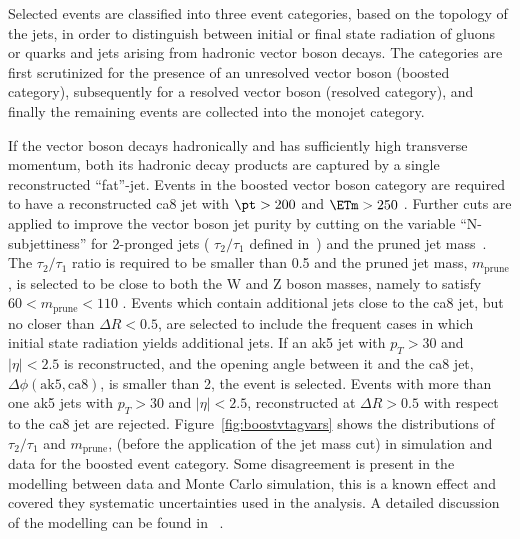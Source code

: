 Selected events are classified into three event categories, based on the topology of the jets, in order to distinguish between 
initial or final state radiation of gluons or quarks and jets arising from hadronic vector boson decays.
The categories are first scrutinized for the presence of an unresolved
vector boson (boosted category), subsequently for a resolved vector
boson (resolved category), and finally the remaining events are collected into the monojet category. 

If the vector boson decays hadronically and has sufficiently high transverse momentum, both its hadronic
decay products are captured by a single reconstructed ``fat''-jet.
Events in the boosted vector boson category are required to
have a reconstructed ca8 jet with $\pt>200$ \gev and  $\ETm>250$ \gev.  Further cuts are applied to improve the vector boson jet
purity by cutting on the variable ``N-subjettiness'' for 2-pronged
jets ( $\tau_2/\tau_1$ defined in~\cite{Thaler:2010tr,Thaler:2011gf})
and the pruned jet mass~\cite{Ellis:2009me}. The $\tau_2/\tau_1$ ratio
is required to be smaller than 0.5 and the pruned jet mass, $m_{\mathrm{prune}}$, is selected to
be close to both the W and Z boson masses, namely to satisfy $60<m_{\mathrm{prune}}<110$ \gev.   
Events which contain additional jets close to the ca8 jet, but no closer than $\Delta R < 0.5$,
are selected to include the frequent cases in which initial state radiation yields additional jets. 
If an ak5 jet with $p_T>30$ and $|\eta|<2.5$ is reconstructed, and the opening angle between it 
and the ca8 jet, $\Delta\phi(\mathrm{ak5,ca8})$, is smaller than 2, the event is selected. Events with more than one ak5 jets 
with $p_T>30$ \gev and $|\eta|<2.5$, reconstructed at $\Delta R> 0.5$ with respect to the ca8 jet 
are rejected.
Figure~\ref{fig:boostvtagvars} shows the distributions of $\tau_2/\tau_1$ and $m_{\mathrm{prune}}$, (before the application 
of the jet mass cut) in simulation and data for the boosted event category. Some disagreement is present in the modelling between data and Monte Carlo simulation, this is a known effect and covered they systematic uncertainties used in the analysis. A detailed discussion of the modelling can be found in ~\cite{Khachatryan:2014vla}.  
